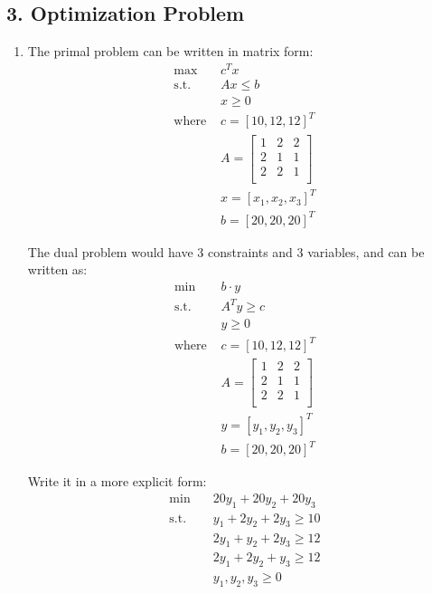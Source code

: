 \documentclass[12pt]{article}
\begin{document}
\subsection*{3. Optimization Problem} 
\begin{enumerate}[label= (\alph*), leftmargin=2em]
\item The primal problem can be written in matrix form:
\begin{align*}
\max \quad &c^T x \\
\text{s.t. } &Ax \leq b \\
&x \geq 0 \\
\text{where } &c = [10, 12, 12]^T \\
&A = \begin{bmatrix}
1 & 2 & 2 \\
2 & 1 & 1 \\
2 & 2 & 1 \\
\end{bmatrix} \\
&x = [x_1, x_2, x_3]^T \\
&b = [20, 20, 20]^T 
\end{align*}

The dual problem would have 3 constraints and 3 variables, and can be written as:
\begin{align*}
\min \quad &b\cdot y \\
\text{s.t. } &A^T y \geq c \\
&y \geq 0 \\
\text{where } &c = [10, 12, 12]^T \\
&A = \begin{bmatrix}
1 & 2 & 2 \\
2 & 1 & 1 \\
2 & 2 & 1 \\
\end{bmatrix} \\
&y = [y_1, y_2, y_3]^T \\
&b = [20, 20, 20]^T 
\end{align*}

Write it in a more explicit form:
\begin{align*}
\min \quad &20y_1 + 20y_2 + 20y_3 \\
\text{s.t. } &y_1 + 2y_2 + 2y_3 \geq 10 \\
&2y_1 + y_2 + 2y_3 \geq 12 \\
&2y_1 + 2y_2 + y_3 \geq 12 \\
&y_1, y_2, y_3 \geq 0
\end{align*}


\end{enumerate}
\end{document}
